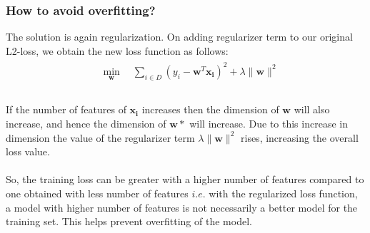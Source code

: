 \documentclass[12pt]{article}
\begin{document}
\subsubsection{How to avoid overfitting?}
The solution is again regularization. On adding regularizer term to our original L2-loss, we obtain the new loss function as follows:
\begin{gather}
    \begin{aligned}
        & \min_{\boldsymbol{w}} \quad \sum_{i \in D}   (y_i - \boldsymbol{w}^T\boldsymbol{x_i})^2  + \lambda\|\boldsymbol{w}\|^2           \nonumber\\
    \end{aligned}
\end{gather}
\\
If the number of features of $\boldsymbol{x_i}$ increases then the dimension of $\boldsymbol{w}$ will also increase, and hence the dimension of $\boldsymbol{w}*$ will increase. Due to this increase in dimension the value of the  regularizer term $\lambda\|\boldsymbol{w}\|^2$ rises, increasing the overall loss value. \\
\\
So, the training loss can be greater with a higher number of features compared to one obtained with less number of features $i.e.$ with the regularized loss function, a model with higher number of features is not necessarily a better model for the training set. This helps prevent overfitting of the model.
\end{document}
